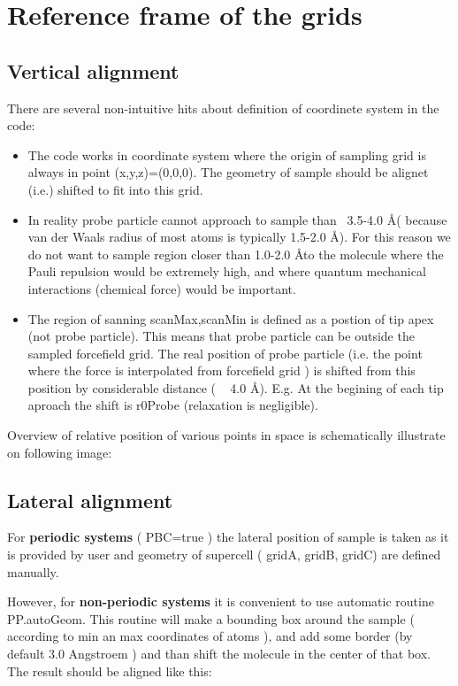 \section{Reference frame of the grids}

\subsection{Vertical alignment}

There are several non-intuitive hits about definition of coordinete system in
the code:


\begin{itemize}
    \item The code works in coordinate system where the origin of sampling grid
    is always in point (x,y,z)=(0,0,0). The geometry of sample should be alignet
    (i.e.) shifted to fit into this grid. 

    \item In reality probe particle cannot approach to sample than ~3.5-4.0
    \AA ( because van der Waals radius of most atoms is typically 1.5-2.0
    \AA ). For this reason we do not want to sample region closer than
    1.0-2.0 \AA to the molecule where the Pauli repulsion would be
    extremely high, and where quantum mechanical interactions (chemical force)
    would be important. 

    \item The region of sanning scanMax,scanMin is defined as a postion of tip
    apex (not probe particle). This means that probe particle can be outside the
    sampled forcefield grid. The real position of probe particle (i.e. the point
    where the force is interpolated from forcefield grid ) is shifted from this
    position by considerable distance ( ~ 4.0 \AA ). E.g. At the begining
    of each tip aproach the shift is r0Probe (relaxation is negligible).

    
\end{itemize}



Overview of relative position of various points in space is schematically
illustrate on following image: 




\subsection{Lateral alignment}
For \textbf{ periodic systems} ( PBC=true ) the lateral position of sample is taken as it
is provided by user and geometry of supercell ( gridA, gridB, gridC) are defined
manually.

However, for \textbf{ non-periodic systems } it is convenient to use automatic routine
PP.autoGeom. This routine will make a bounding box around the sample ( according
to min an max coordinates of atoms ), and add some border (by default 3.0
Angstroem ) and than shift the molecule in the center of that box. The result
should be aligned like this:
